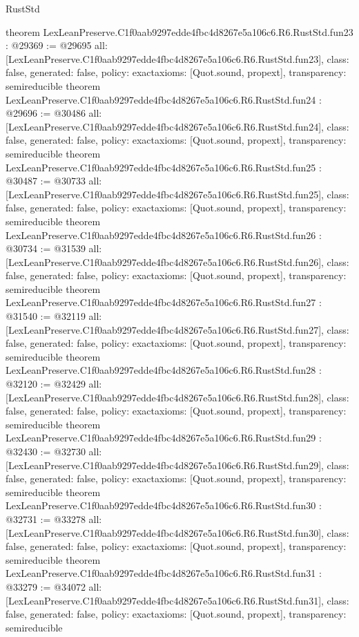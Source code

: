 \begin{lexlean}{RustStd}
\begin{coremodule}
{}
theorem LexLeanPreserve.C1f0aab9297edde4fbc4d8267e5a106c6.R6.RustStd.fun23 : @29369 := @29695 {
  all: [LexLeanPreserve.C1f0aab9297edde4fbc4d8267e5a106c6.R6.RustStd.fun23],
  class: false,
  generated: false,
  policy: exact{axioms: [Quot.sound, propext]},
  transparency: semireducible
}
theorem LexLeanPreserve.C1f0aab9297edde4fbc4d8267e5a106c6.R6.RustStd.fun24 : @29696 := @30486 {
  all: [LexLeanPreserve.C1f0aab9297edde4fbc4d8267e5a106c6.R6.RustStd.fun24],
  class: false,
  generated: false,
  policy: exact{axioms: [Quot.sound, propext]},
  transparency: semireducible
}
theorem LexLeanPreserve.C1f0aab9297edde4fbc4d8267e5a106c6.R6.RustStd.fun25 : @30487 := @30733 {
  all: [LexLeanPreserve.C1f0aab9297edde4fbc4d8267e5a106c6.R6.RustStd.fun25],
  class: false,
  generated: false,
  policy: exact{axioms: [Quot.sound, propext]},
  transparency: semireducible
}
theorem LexLeanPreserve.C1f0aab9297edde4fbc4d8267e5a106c6.R6.RustStd.fun26 : @30734 := @31539 {
  all: [LexLeanPreserve.C1f0aab9297edde4fbc4d8267e5a106c6.R6.RustStd.fun26],
  class: false,
  generated: false,
  policy: exact{axioms: [Quot.sound, propext]},
  transparency: semireducible
}
theorem LexLeanPreserve.C1f0aab9297edde4fbc4d8267e5a106c6.R6.RustStd.fun27 : @31540 := @32119 {
  all: [LexLeanPreserve.C1f0aab9297edde4fbc4d8267e5a106c6.R6.RustStd.fun27],
  class: false,
  generated: false,
  policy: exact{axioms: [Quot.sound, propext]},
  transparency: semireducible
}
theorem LexLeanPreserve.C1f0aab9297edde4fbc4d8267e5a106c6.R6.RustStd.fun28 : @32120 := @32429 {
  all: [LexLeanPreserve.C1f0aab9297edde4fbc4d8267e5a106c6.R6.RustStd.fun28],
  class: false,
  generated: false,
  policy: exact{axioms: [Quot.sound, propext]},
  transparency: semireducible
}
theorem LexLeanPreserve.C1f0aab9297edde4fbc4d8267e5a106c6.R6.RustStd.fun29 : @32430 := @32730 {
  all: [LexLeanPreserve.C1f0aab9297edde4fbc4d8267e5a106c6.R6.RustStd.fun29],
  class: false,
  generated: false,
  policy: exact{axioms: [Quot.sound, propext]},
  transparency: semireducible
}
theorem LexLeanPreserve.C1f0aab9297edde4fbc4d8267e5a106c6.R6.RustStd.fun30 : @32731 := @33278 {
  all: [LexLeanPreserve.C1f0aab9297edde4fbc4d8267e5a106c6.R6.RustStd.fun30],
  class: false,
  generated: false,
  policy: exact{axioms: [Quot.sound, propext]},
  transparency: semireducible
}
theorem LexLeanPreserve.C1f0aab9297edde4fbc4d8267e5a106c6.R6.RustStd.fun31 : @33279 := @34072 {
  all: [LexLeanPreserve.C1f0aab9297edde4fbc4d8267e5a106c6.R6.RustStd.fun31],
  class: false,
  generated: false,
  policy: exact{axioms: [Quot.sound, propext]},
  transparency: semireducible
}
\end{coremodule}
\end{lexlean}
